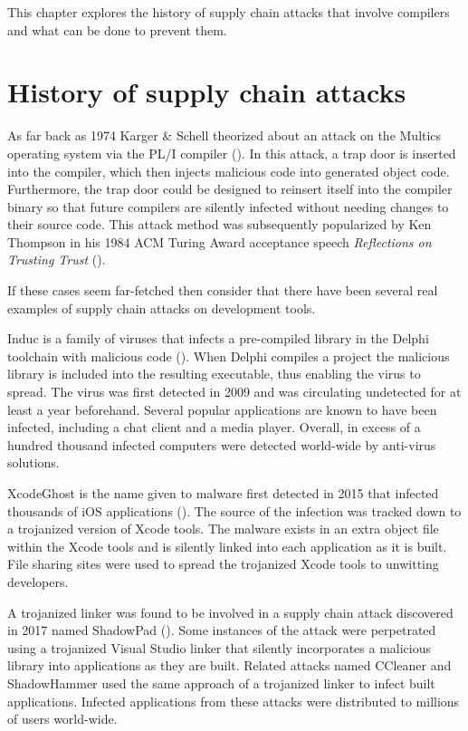 \documentclass[
  a4paper,
]{report}
\begin{document}
This chapter explores the history of supply chain attacks that involve
compilers and what can be done to prevent them.

\section{History of supply chain
attacks}\label{history-of-supply-chain-attacks}

As far back as 1974 Karger \& Schell theorized about an attack on the
Multics operating system via the PL/I compiler
(). In this attack,
a trap door is inserted into the compiler, which then injects malicious
code into generated object code. Furthermore, the trap door could be
designed to reinsert itself into the compiler binary so that future
compilers are silently infected without needing changes to their source
code. This attack method was subsequently popularized by Ken Thompson in
his 1984 ACM Turing Award acceptance speech \emph{Reflections on
Trusting Trust} ().

If these cases seem far-fetched then consider that there have been
several real examples of supply chain attacks on development tools.

Induc is a family of viruses that infects a pre-compiled library in the
Delphi toolchain with malicious code (). When Delphi compiles a project the malicious library is included
into the resulting executable, thus enabling the virus to spread. The
virus was first detected in 2009 and was circulating undetected for at
least a year beforehand. Several popular applications are known to have
been infected, including a chat client and a media player. Overall, in
excess of a hundred thousand infected computers were detected world-wide
by anti-virus solutions.

XcodeGhost is the name given to malware first detected in 2015 that
infected thousands of iOS applications (). The source of the infection was tracked down to a trojanized
version of Xcode tools. The malware exists in an extra object file
within the Xcode tools and is silently linked into each application as
it is built. File sharing sites were used to spread the trojanized Xcode
tools to unwitting developers.

A trojanized linker was found to be involved in a supply chain attack
discovered in 2017 named ShadowPad
(). Some instances of the
attack were perpetrated using a trojanized Visual Studio linker that
silently incorporates a malicious library into applications as they are
built. Related attacks named CCleaner and ShadowHammer used the same
approach of a trojanized linker to infect built applications. Infected
applications from these attacks were distributed to millions of users
world-wide.
\end{document}
